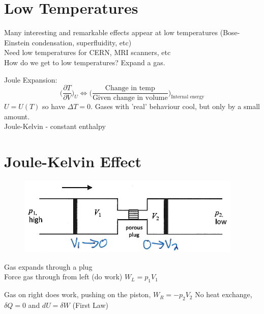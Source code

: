 \documentclass[a4paper, 11pt, normalem]{report}
\newcommand\p{\partial}
\begin{document}
\section{Low Temperatures}
Many interesting and remarkable effects appear at low temperatures (Bose-Einstein condensation, superfluidity, etc) \\
Need low temperatures for CERN, MRI scanners, etc \\
How do we get to low temperatures? Expand a gas.

Joule Expansion:
\begin{equation*}
    \Big(\frac{\p T}{\p V}\Big)_U \iff \Big(\frac{\text{Change in temp}}{\text{Given change in volume}}\Big)_{\text{Internal energy}}
\end{equation*}
$U = U(T)$ so have $\Delta T = 0$. Gases with 'real' behaviour cool, but only by a small amount. \\
Joule-Kelvin - constant enthalpy

\section{Joule-Kelvin Effect}
\begin{figure}
    \begin{center}
        \vspace{-20pt}
        \includegraphics[scale=0.45]{JouleKelvin1.png}
        \vspace{-40pt}
    \end{center}
\end{figure}

Gas expands through a plug \\
Force gas through from left (do work) $W_L = p_1 V_1$

Gas on right does work, pushing on the piston, $W_R = -p_2 V_2$
No heat exchange, $\delta Q = 0$ and $dU = \delta W$ (First Law)
\end{document}
